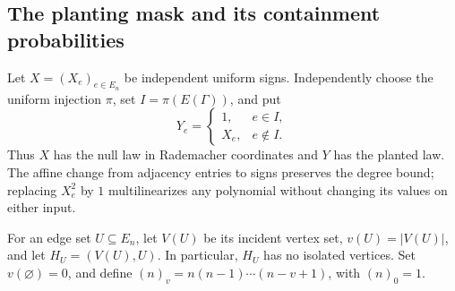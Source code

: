 \documentclass[11pt]{article}
\newcommand{\1}{\mathbf 1}
\theoremstyle{definition}
\theoremstyle{remark}
\numberwithin{equation}{section}
\begin{document}
\subsection{The planting mask and its containment probabilities}
Let $X=(X_e)_{e\in E_n}$ be independent uniform signs. Independently choose the uniform injection $\pi$, set $I=\pi(E(\Gamma))$, and put
\begin{equation}\label{eq:plant}
 Y_e=\begin{cases}1,&e\in I,\\X_e,&e\notin I.\end{cases}
\end{equation}
Thus $X$ has the null law in Rademacher coordinates and $Y$ has the planted law. The affine change from adjacency entries to signs preserves the degree bound; replacing $X_e^2$ by $1$ multilinearizes any polynomial without changing its values on either input.

For an edge set $U\subseteq E_n$, let $V(U)$ be its incident vertex set, $v(U)=|V(U)|$, and let $H_U=(V(U),U)$. In particular, $H_U$ has no isolated vertices. Set $v(\varnothing)=0$, and define $(n)_v=n(n-1)\cdots(n-v+1)$, with $(n)_0=1$.
\end{document}
